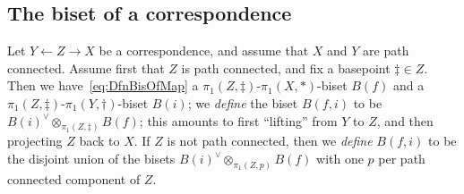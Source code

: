 \documentclass{amsart}
\begin{document}
\subsection{The biset of a correspondence}\label{ss:biset of correspondence}
Let $Y\leftarrow Z\rightarrow X$ be a correspondence, and assume that
$X$ and $Y$ are path connected. Assume first that $Z$ is path
connected, and fix a basepoint $\ddagger\in Z$. Then we
have~\eqref{eq:DfnBisOfMap} a $\pi_1(Z,\ddagger)$-$\pi_1(X,*)$-biset
$B(f)$ and a $\pi_1(Z,\ddagger)$-$\pi_1(Y,\dagger)$-biset $B(i)$; we
\emph{define} the biset $B(f,i)$ to be
$B(i)^\vee\otimes_{\pi_1(Z,\ddagger)} B(f)$; this amounts to first
``lifting'' from $Y$ to $Z$, and then projecting $Z$ back to $X$. If
$Z$ is not path connected, then we \emph{define} $B(f,i)$ to be the
disjoint union of the bisets $B(i)^\vee\otimes_{\pi_1(Z,p)} B(f)$ with
one $p$ per path connected component of $Z$.
\end{document}
